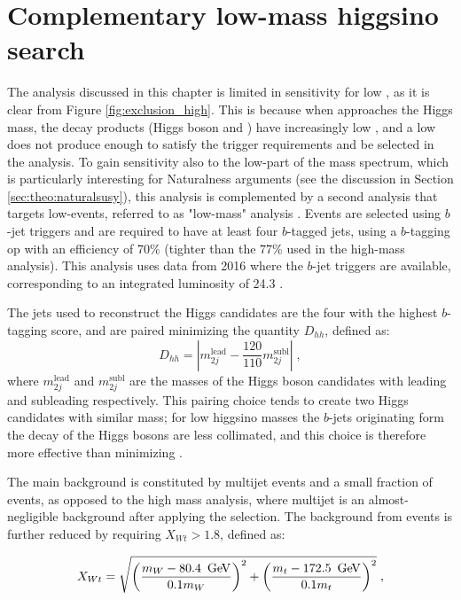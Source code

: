 \section{Complementary low-mass higgsino search}
\label{sec:ewk:LM}

The analysis discussed in this chapter is limited in sensitivity for low \mhino, as it is clear from Figure \ref{fig:exclusion_high}. 
This is because when \mhino approaches the Higgs mass, the decay products (Higgs boson and \gravino)
have increasingly low \pt, and a low \pt \gravino does not produce enough \met to satisfy the \met trigger requirements and be selected 
in the analysis. 
To gain sensitivity also to the low-\mhino part of the mass spectrum, which is particularly interesting for Naturalness arguments (see the 
discussion in Section \ref{sec:theo:naturalsusy}), 
this analysis is complemented by a second analysis that targets low-\met events, referred to as "low-mass" analysis \cite{Aaboud:2018htj}. 
Events are selected using $b$-jet triggers and are required to have at least four $b$-tagged jets, 
using a $b$-tagging \gls{op} with an efficiency of 70\%
(tighter than the 77\% used in the high-mass analysis).
This analysis uses data from 2016 where the $b$-jet triggers are available, corresponding to an integrated luminosity of 24.3 \ifb.

The jets used to reconstruct the Higgs candidates are the four with the highest $b$-tagging score, and are paired minimizing the quantity 
$D_{hh}$, defined as:
\begin{equation}
  D_{hh} = \left|m_{2j}^\textrm{lead} - \frac{120}{110}m_{2j}^\textrm{subl}\right| \; ,
\end{equation}
where $m_{2j}^\textrm{lead}$ and $m_{2j}^\textrm{subl}$ are the masses of the Higgs boson candidates with leading and subleading \pt respectively.
This pairing choice tends to create two Higgs candidates with similar mass; 
for low higgsino masses the $b$-jets originating form the decay of the Higgs bosons are less collimated, 
and this choice is therefore more effective than minimizing \dRmax. 

The main background is constituted by multijet events and a small fraction of \ttbar events, as opposed to the
high mass analysis, where multijet is an almost-negligible background after applying the \dphimin selection. 
The background from \ttbar events is further reduced by requiring $X_{Wt}>1.8$, defined as:

\begin{equation}
 X_{Wt} = \sqrt{\left( \frac{m_W - 80.4\,\ \gev}{0.1  m_W} \right)^2 + \left( \frac{m_t - 172.5\,\ \gev}{0.1  m_t} \right)^2 } \;,
\label{eqn:xwt}
\end{equation}

